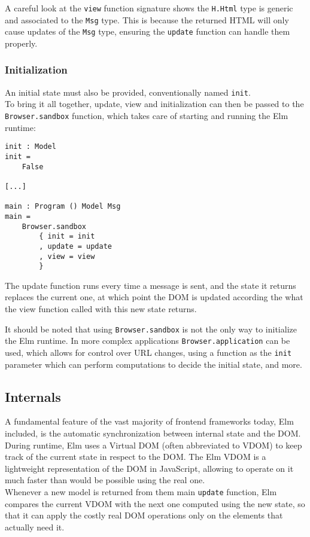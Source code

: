 A careful look at the \texttt{view} function signature shows the \texttt{H.Html} type is generic and associated to the \texttt{Msg} type. This is because the returned HTML will only cause updates of the \texttt{Msg} type, ensuring the \texttt{update} function can handle them properly.

\subsubsection{Initialization}
An initial state must also be provided, conventionally named \texttt{init}.\\
To bring it all together, update, view and initialization can then be passed to the \texttt{Browser.sandbox} function, which takes care of starting and running the Elm runtime:
\begin{verbatim}
init : Model
init =
    False

[...]

main : Program () Model Msg
main =
    Browser.sandbox
        { init = init
        , update = update
        , view = view
        }
\end{verbatim}

The update function runs every time a message is sent, and the state it returns replaces the current one, at which point the DOM is updated according the what the view function called with this new state returns.

It should be noted that using \texttt{Browser.sandbox} is not the only way to initialize the Elm runtime. In more complex applications \texttt{Browser.application} can be used, which allows for control over URL changes, using a function as the \texttt{init} parameter which can perform computations to decide the initial state, and more.

\subsection{Internals}
A fundamental feature of the vast majority of frontend frameworks today, Elm included, is the automatic synchronization between internal state and the DOM.\\

During runtime, Elm uses a Virtual DOM (often abbreviated to VDOM) to keep track of the current state in respect to the DOM. The Elm VDOM is a lightweight representation of the DOM in JavaScript, allowing to operate on it much faster than would be possible using the real one.\cite{noauthor_htmllazy_nodate}\\

Whenever a new model is returned from them main \texttt{update} function, Elm compares the current VDOM with the next one computed using the new state, so that it can apply the costly real DOM operations only on the elements that actually need it.\\

